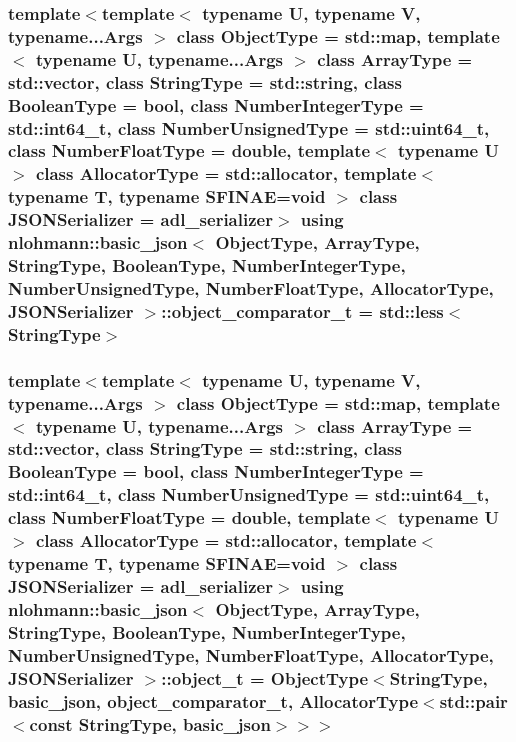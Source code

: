 \subsubsection[{\texorpdfstring{object\+\_\+comparator\+\_\+t}{object_comparator_t}}]{\setlength{\rightskip}{0pt plus 5cm}template$<$template$<$ typename U, typename V, typename...\+Args $>$ class Object\+Type = std\+::map, template$<$ typename U, typename...\+Args $>$ class Array\+Type = std\+::vector, class String\+Type  = std\+::string, class Boolean\+Type  = bool, class Number\+Integer\+Type  = std\+::int64\+\_\+t, class Number\+Unsigned\+Type  = std\+::uint64\+\_\+t, class Number\+Float\+Type  = double, template$<$ typename U $>$ class Allocator\+Type = std\+::allocator, template$<$ typename T, typename S\+F\+I\+N\+A\+E=void $>$ class J\+S\+O\+N\+Serializer = adl\+\_\+serializer$>$ using {\bf nlohmann\+::basic\+\_\+json}$<$ Object\+Type, Array\+Type, String\+Type, Boolean\+Type, Number\+Integer\+Type, Number\+Unsigned\+Type, Number\+Float\+Type, Allocator\+Type, J\+S\+O\+N\+Serializer $>$\+::{\bf object\+\_\+comparator\+\_\+t} =  std\+::less$<$String\+Type$>$}\hypertarget{classnlohmann_1_1basic__json_abed9e77c5fcfc925fcdd489911069c3b}{}\label{classnlohmann_1_1basic__json_abed9e77c5fcfc925fcdd489911069c3b}
\subsubsection[{\texorpdfstring{object\+\_\+t}{object_t}}]{\setlength{\rightskip}{0pt plus 5cm}template$<$template$<$ typename U, typename V, typename...\+Args $>$ class Object\+Type = std\+::map, template$<$ typename U, typename...\+Args $>$ class Array\+Type = std\+::vector, class String\+Type  = std\+::string, class Boolean\+Type  = bool, class Number\+Integer\+Type  = std\+::int64\+\_\+t, class Number\+Unsigned\+Type  = std\+::uint64\+\_\+t, class Number\+Float\+Type  = double, template$<$ typename U $>$ class Allocator\+Type = std\+::allocator, template$<$ typename T, typename S\+F\+I\+N\+A\+E=void $>$ class J\+S\+O\+N\+Serializer = adl\+\_\+serializer$>$ using {\bf nlohmann\+::basic\+\_\+json}$<$ Object\+Type, Array\+Type, String\+Type, Boolean\+Type, Number\+Integer\+Type, Number\+Unsigned\+Type, Number\+Float\+Type, Allocator\+Type, J\+S\+O\+N\+Serializer $>$\+::{\bf object\+\_\+t} =  Object\+Type$<$String\+Type, {\bf basic\+\_\+json}, {\bf object\+\_\+comparator\+\_\+t}, Allocator\+Type$<$std\+::pair$<$const String\+Type, {\bf basic\+\_\+json}$>$$>$$>$}\hypertarget{classnlohmann_1_1basic__json_a0322396ca5cd4623bc816bf735377623}{}\label{classnlohmann_1_1basic__json_a0322396ca5cd4623bc816bf735377623}



